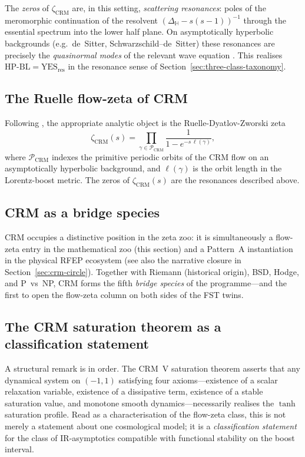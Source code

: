 \documentclass[11pt]{article}
\theoremstyle{definition}
\theoremstyle{remark}
\newcommand{\HBL}{\mathrm{HP\text{-}BL}}
\begin{document}
The \emph{zeros} of $\zeta_{\mathrm{CRM}}$ are, in this setting,
\emph{scattering resonances}: poles of the meromorphic continuation
of the resolvent $(\Delta_{\mathbb{H}} - s(s-1))^{-1}$ through the
essential spectrum into the lower half plane. On asymptotically
hyperbolic backgrounds (e.g.\ de~Sitter, Schwarzschild--de~Sitter)
these resonances are precisely the \emph{quasinormal modes} of the
relevant wave equation \cite{DyatlovZworski2019}. This realises
$\HBL = \mathrm{YES}_{\mathrm{res}}$ in the resonance sense of
Section~\ref{sec:three-class-taxonomy}.

\subsection{The Ruelle flow-zeta of CRM}

Following \cite{DyatlovZworski2019}, the appropriate analytic object
is the Ruelle-Dyatlov-Zworski zeta
\begin{equation}
\label{eq:crm-flow-zeta}
  \zeta_{\mathrm{CRM}}(s)
  = \prod_{\gamma \in \mathcal{P}_{\mathrm{CRM}}}
    \frac{1}{1 - e^{-s\,\ell(\gamma)}},
\end{equation}
where $\mathcal{P}_{\mathrm{CRM}}$ indexes the primitive periodic
orbits of the CRM flow on an asymptotically hyperbolic background,
and $\ell(\gamma)$ is the orbit length in the Lorentz-boost metric.
The zeros of $\zeta_{\mathrm{CRM}}(s)$ are the resonances described
above.

\subsection{CRM as a bridge species}

CRM occupies a distinctive position in the zeta zoo: it is
simultaneously a flow-zeta entry in the mathematical zoo (this
section) and a Pattern~A instantiation in the physical RFEP
ecosystem \cite{RFEPFramework} (see also the narrative closure in
Section~\ref{sec:crm-circle}). Together with Riemann (historical
origin), BSD, Hodge, and P~vs~NP, CRM forms the fifth
\emph{bridge species} of the programme---and the first to open the
flow-zeta column on both sides of the FST twins.

\subsection{The CRM saturation theorem as a classification
statement}
\label{sec:crm-saturation-classification}

A structural remark is in order. The CRM~V saturation theorem
\cite{CRMV} asserts that any dynamical system on $(-1,1)$ satisfying
four axioms---existence of a scalar relaxation variable, existence of
a dissipative term, existence of a stable saturation value, and
monotone smooth dynamics---necessarily realises the $\tanh$ saturation
profile. Read as a characterisation of the flow-zeta class, this is
not merely a statement about one cosmological model; it is a
\emph{classification statement} for the class of IR-asymptotics
compatible with functional stability on the boost interval.
\end{document}
